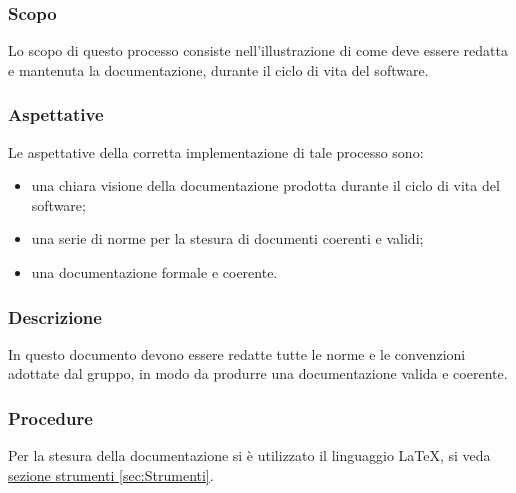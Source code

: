 \subsubsection{Scopo}
Lo scopo di questo processo consiste nell'illustrazione di come deve essere redatta e mantenuta
la documentazione, durante il ciclo di vita del software.
\subsubsection{Aspettative}
Le aspettative della corretta implementazione di tale processo sono:
\begin{itemize}
	\item una chiara visione della documentazione prodotta durante il ciclo di vita
del software;
	\item una serie di norme per la stesura di documenti coerenti e validi;
	\item una documentazione formale e coerente.
\end{itemize}
\subsubsection{Descrizione}
In questo documento devono essere redatte tutte le norme e le convenzioni adottate dal gruppo,
in modo da produrre una documentazione valida e coerente.
\subsubsection{Procedure}
Per la stesura della documentazione si è utilizzato il linguaggio \LaTeX, si veda \hyperref[sec:Strumenti]{sezione strumenti \ref*{sec:Strumenti}}.
